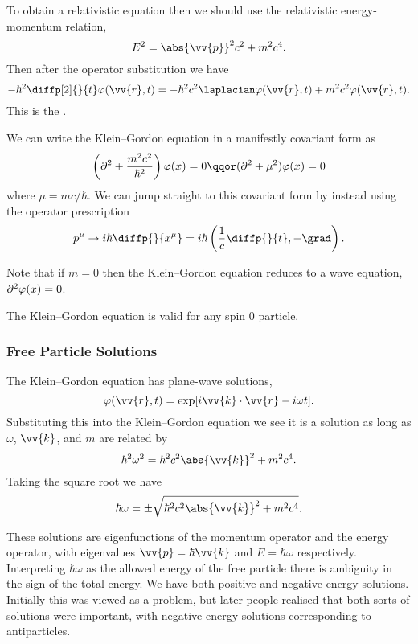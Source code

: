 To obtain a relativistic equation then we should use the relativistic energy-momentum relation,
\begin{equation}
    E^2 = \abs{\vv{p}}^2 c^2 + m^2 c^4.
\end{equation}
Then after the operator substitution we have
\begin{equation}
    -\hbar^2 \diffp[2]{}{t}\varphi(\vv{r}, t) = -\hbar^2c^2\laplacian \varphi(\vv{r}, t) + m^2c^2\varphi(\vv{r}, t).
\end{equation}
This is the .

We can write the Klein--Gordon equation in a manifestly covariant form as
\begin{equation}
    \left( \dalembertian + \frac{m^2c^2}{\hbar^2} \right)\varphi(x) = 0 \qqor (\dalembertian + \mu^2)\varphi(x) = 0
\end{equation}
where \(\mu = mc/\hbar\).
We can jump straight to this covariant form by instead using the operator prescription
\begin{equation}
    p^\mu \to i\hbar \diffp{}{x^\mu} = i\hbar\left( \frac{1}{c}\diffp{}{t}, -\grad \right).
\end{equation}

Note that if \(m = 0\) then the Klein--Gordon equation reduces to a wave equation, \(\partial^2 \varphi(x) = 0\).

The Klein--Gordon equation is valid for any spin 0 particle.

\subsubsection{Free Particle Solutions}
The Klein--Gordon equation has plane-wave solutions,
\begin{equation}
    \varphi(\vv{r}, t)  = \exp[i\vv{k} \cdot \vv{r} - i\omega t].
\end{equation}
Substituting this into the Klein--Gordon equation we see it is a solution as long as \(\omega\), \(\vv{k}\), and \(m\) are related by
\begin{equation}
    \hbar^2\omega^2 = \hbar^2c^2\abs{\vv{k}}^2 + m^2c^4.
\end{equation}
Taking the square root we have
\begin{equation}
    \hbar\omega = \pm \sqrt{\hbar^2c^2\abs{\vv{k}}^2 + m^2c^4}.
\end{equation}

These solutions are eigenfunctions of the momentum operator and the energy operator, with eigenvalues \(\vv{p} = \hbar\vv{k}\) and \(E = \hbar\omega\) respectively.
Interpreting \(\hbar\omega\) as the allowed energy of the free particle there is ambiguity in the sign of the total energy.
We have both positive and negative energy solutions.
Initially this was viewed as a problem, but later people realised that both sorts of solutions were important, with negative energy solutions corresponding to antiparticles.

